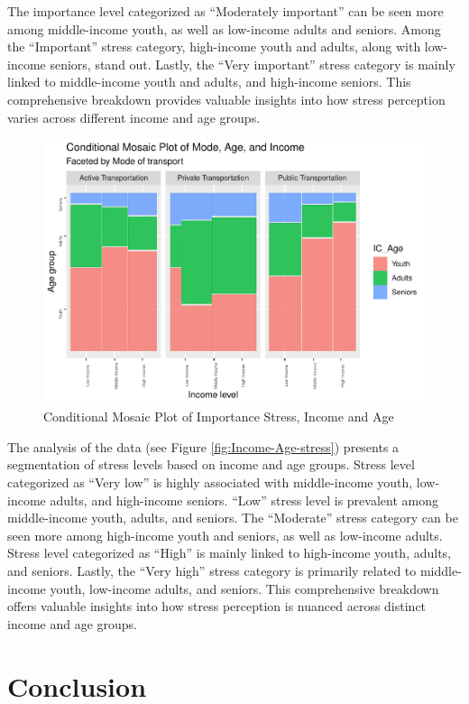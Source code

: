 \documentclass[
11pt, %
oneside, %
english, %
singlespacing, %
]{macthesis} %
\begin{document}
The importance level categorized as ``Moderately important'' can be seen more among middle-income youth, as well as low-income adults and seniors. Among the ``Important'' stress category, high-income youth and adults, along with low-income seniors, stand out. Lastly, the ``Very important'' stress category is mainly linked to middle-income youth and adults, and high-income seniors. This comprehensive breakdown provides valuable insights into how stress perception varies across different income and age groups.
\begin{figure}
\includegraphics[width=0.85\linewidth]{thesis_files/figure-latex/unnamed-chunk-30-1} \caption{\label{fig:Income-Age-stress}Conditional Mosaic Plot of Importance Stress, Income and Age}\label{fig:unnamed-chunk-30}
\end{figure}
The analysis of the data (see Figure \ref{fig:Income-Age-stress}) presents a segmentation of stress levels based on income and age groups. Stress level categorized as ``Very low'' is highly associated with middle-income youth, low-income adults, and high-income seniors. ``Low'' stress level is prevalent among middle-income youth, adults, and seniors. The ``Moderate'' stress category can be seen more among high-income youth and seniors, as well as low-income adults. Stress level categorized as ``High'' is mainly linked to high-income youth, adults, and seniors. Lastly, the ``Very high'' stress category is primarily related to middle-income youth, low-income adults, and seniors. This comprehensive breakdown offers valuable insights into how stress perception is nuanced across distinct income and age groups.

\hypertarget{conclusion}{%
\section{Conclusion}\label{conclusion}}
\end{document}

